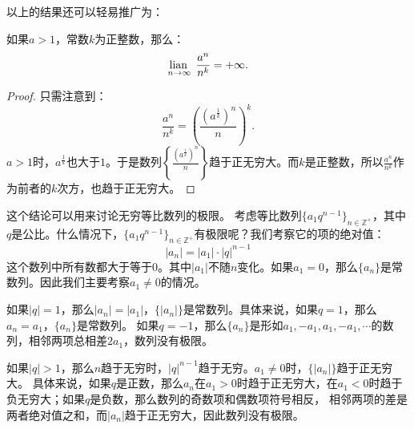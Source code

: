 \documentclass[12pt,UTF8,fontset=none]{ctexbook}
\begin{document}
以上的结果还可以轻易推广为：
\begin{et}
    如果$a>1$，常数$k$为正整数，那么：
    $$ \underset{n\to\infty}{\operatorname{lian}\,}\,\; \frac{a^n}{n^k} = +\infty.$$
\end{et}
\begin{proof}
    只需注意到：
    $$\frac{a^n}{n^k} = \left(\frac{\left(a^{\frac{1}{k}}\right)^n}{n}\right)^k.$$
    $a>1$时，$\displaystyle a^{\frac{1}{k}}$也大于$1$。于是数列$\displaystyle\left\{\frac{\left(a^{\frac{1}{k}}\right)^n}{n}\right\}$趋于正无穷大。而$k$是正整数，所以$\frac{a^n}{n^k}$作为前者的$k$次方，也趋于正无穷大。
\end{proof}

这个结论可以用来讨论无穷等比数列的极限。
考虑等比数列$\{a_1 q^{n-1}\}_{n\in\mathbb{Z}^+}$，其中$q$是公比。什么情况下，$\{a_1 q^{n-1}\}_{n\in\mathbb{Z}^+}$有极限呢？我们考察它的项的绝对值：
$$|a_n| = |a_1|\cdot|q|^{n-1}$$
这个数列中所有数都大于等于$0$。其中$|a_1|$不随$n$变化。如果$a_1=0$，那么$\{a_n\}$是常数列。因此我们主要考察$a_1 \neq 0$的情况。

如果$|q|=1$，那么$|a_n| = |a_1|$，$\{|a_n|\}$是常数列。具体来说，如果$q=1$，那么$a_n = a_1$，$\{a_n\}$是常数列。
如果$q = -1$，那么$\{a_n\}$是形如$a_1, -a_1, a_1, -a_1, \cdots$的数列，相邻两项总相差$2a_1$，数列没有极限。

如果$|q| > 1$，那么$n$趋于无穷时，$|q|^{n-1}$趋于无穷。$a_1 \neq 0$时，$\{|a_n|\}$趋于正无穷大。
具体来说，如果$q$是正数，那么$a_n$在$a_1>0$时趋于正无穷大，在$a_1<0$时趋于负无穷大；如果$q$是负数，那么数列的奇数项和偶数项符号相反，
相邻两项的差是两者绝对值之和，而$|a_n|$趋于正无穷大，因此数列没有极限。
\end{document}
